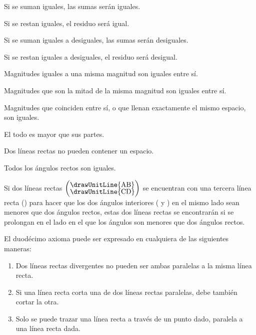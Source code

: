 \documentclass[booklanguage=english]{byrnebook}
\begin{document}
\startaxiom{}\label{ax:I.II}
Si se suman iguales, las sumas serán iguales.

\startaxiom{}\label{ax:I.III}
Si se restan iguales, el residuo será igual.

\startaxiom{}\label{ax:I.IV}
Si se suman iguales a desiguales, las sumas serán desiguales.

\startaxiom{}\label{ax:I.V}
Si se restan iguales a desiguales, el residuo será desigual.

\startaxiom{}\label{ax:I.VI}
Magnitudes iguales a una misma magnitud son iguales entre sí.

\startaxiom{}\label{ax:I.VII}
Magnitudes que son la mitad de la misma magnitud son iguales entre sí.

\startaxiom{}\label{ax:I.VIII}
Magnitudes que coinciden entre sí, o que llenan exactamente el mismo espacio, son iguales.

\startaxiom{}\label{ax:I.IX}
El todo es mayor que sus partes.

\startaxiom{}\label{ax:I.X}
Dos líneas rectas no pueden contener un espacio.

\startaxiom{}\label{ax:I.XI}
Todos los ángulos rectos son iguales.

\startaxiom{}\label{ax:I.XII}
\drawCurrentPictureInMargin[inside]
Si dos líneas rectas $\left(\vcenter{\nointerlineskip\hbox{\drawUnitLine{AB}}\nointerlineskip\hbox{\drawUnitLine{CD}}}\right)$ se encuentran con una tercera línea recta () para hacer que los dos ángulos interiores ( y ) en el mismo lado sean menores que dos ángulos rectos, estas dos líneas rectas se encontrarán si se prolongan en el lado en el que los ángulos son menores que dos ángulos rectos.

El duodécimo axioma puede ser expresado en cualquiera de las siguientes maneras:
\begin{enumerate}
\item Dos líneas rectas divergentes no pueden ser ambas paralelas a la misma línea recta.
\item Si una línea recta corta una de dos líneas rectas paralelas, debe también cortar la otra.
\item Solo se puede trazar una línea recta a través de un punto dado, paralela a una línea recta dada.
\end{enumerate}
\end{document}
